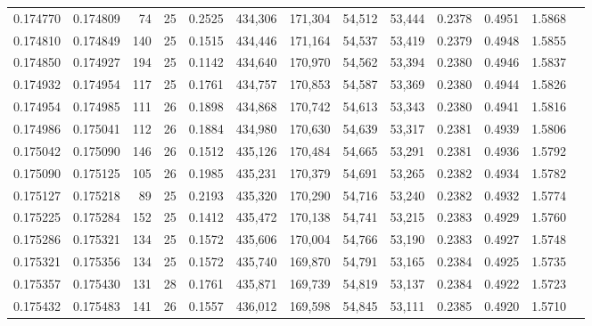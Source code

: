 \begin{tabular}{rrrrrrrrrrrrr}
0.174770 & 0.174809 &  74 &  25 &                                     0.2525 & 434,306 & 171,304 &  54,512 &  53,444 & 0.2378 & 0.4951 & 1.5868 \\
0.174810 & 0.174849 & 140 &  25 &                                     0.1515 & 434,446 & 171,164 &  54,537 &  53,419 & 0.2379 & 0.4948 & 1.5855 \\
0.174850 & 0.174927 & 194 &  25 &                                     0.1142 & 434,640 & 170,970 &  54,562 &  53,394 & 0.2380 & 0.4946 & 1.5837 \\
0.174932 & 0.174954 & 117 &  25 &                                     0.1761 & 434,757 & 170,853 &  54,587 &  53,369 & 0.2380 & 0.4944 & 1.5826 \\
0.174954 & 0.174985 & 111 &  26 &                                     0.1898 & 434,868 & 170,742 &  54,613 &  53,343 & 0.2380 & 0.4941 & 1.5816 \\
0.174986 & 0.175041 & 112 &  26 &                                     0.1884 & 434,980 & 170,630 &  54,639 &  53,317 & 0.2381 & 0.4939 & 1.5806 \\
0.175042 & 0.175090 & 146 &  26 &                                     0.1512 & 435,126 & 170,484 &  54,665 &  53,291 & 0.2381 & 0.4936 & 1.5792 \\
0.175090 & 0.175125 & 105 &  26 &                                     0.1985 & 435,231 & 170,379 &  54,691 &  53,265 & 0.2382 & 0.4934 & 1.5782 \\
0.175127 & 0.175218 &  89 &  25 &                                     0.2193 & 435,320 & 170,290 &  54,716 &  53,240 & 0.2382 & 0.4932 & 1.5774 \\
0.175225 & 0.175284 & 152 &  25 &                                     0.1412 & 435,472 & 170,138 &  54,741 &  53,215 & 0.2383 & 0.4929 & 1.5760 \\
0.175286 & 0.175321 & 134 &  25 &                                     0.1572 & 435,606 & 170,004 &  54,766 &  53,190 & 0.2383 & 0.4927 & 1.5748 \\
0.175321 & 0.175356 & 134 &  25 &                                     0.1572 & 435,740 & 169,870 &  54,791 &  53,165 & 0.2384 & 0.4925 & 1.5735 \\
0.175357 & 0.175430 & 131 &  28 &                                     0.1761 & 435,871 & 169,739 &  54,819 &  53,137 & 0.2384 & 0.4922 & 1.5723 \\
0.175432 & 0.175483 & 141 &  26 &                                     0.1557 & 436,012 & 169,598 &  54,845 &  53,111 & 0.2385 & 0.4920 & 1.5710 \\

\end{tabular}
